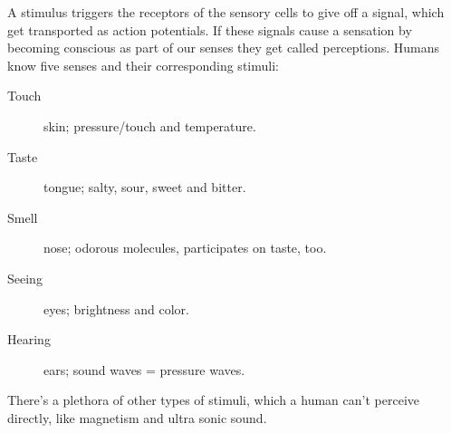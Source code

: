 \documentclass[../main.tex]{subfiles}
\begin{document}
 
A stimulus triggers the receptors of the sensory cells to give off a signal, which get transported as action potentials.
If these signals cause a sensation by becoming conscious as part of our senses they get called perceptions.
Humans know five senses and their corresponding stimuli:
\begin{description}
\item[Touch] skin; pressure/touch and temperature.
\item[Taste] tongue; salty, sour, sweet and bitter.
\item[Smell] nose; odorous molecules, participates on taste, too.
\item[Seeing] eyes; brightness and color.
  \item[Hearing] ears; sound waves = pressure waves.
  \end{description}

  There's a plethora of other types of stimuli, which a human can't perceive directly, like magnetism and ultra sonic sound.
\end{document}
